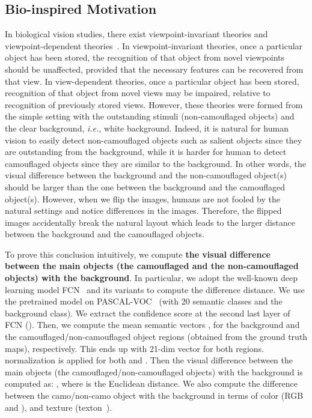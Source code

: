 \documentclass[journal]{IEEEtran}
\begin{document}
\subsection{Bio-inspired Motivation}
\label{sec:motivation}
In biological vision studies, there exist viewpoint-invariant theories and viewpoint-dependent theories~\cite{wilson2003does,burghund2000viewpoint,li2009computational}. In viewpoint-invariant theories, once a particular object has been stored, the recognition of that object from novel viewpoints should be unaffected, provided that the necessary features can be recovered from that view. In view-dependent theories, once a particular object has been stored,
recognition of that object from novel views may be impaired, relative to recognition of previously stored views. However, these theories were formed from the simple setting with the outstanding stimuli (non-camouflaged objects) and the clear background, \textit{i.e.}, white background. Indeed, it is natural for human vision to easily detect non-camouflaged objects such as salient objects since they are outstanding from the background, while it is harder for human to detect camouflaged objects since they are similar to the background. In other words, the visual difference between the background and the non-camouflaged object(s) should be larger than the one between the background and the camouflaged object(s). However, when we flip the images, humans are not fooled by the natural settings and notice differences in the images. Therefore, the flipped images accidentally break the natural layout which leads to the larger distance between the background and the camouflaged objects.



To prove this conclusion intuitively, we compute \textbf{the visual difference between the main objects (the camouflaged and the non-camouflaged objects) with the background}. In particular, we adopt the well-known deep learning model FCN~\cite{Long-ICCV2015} and its variants to compute the difference distance. We use the pretrained model on PASCAL-VOC~\cite{Everingham-ICCV2010} (with 20 semantic classes and the background class). We extract the confidence score at the second last layer of FCN (). Then, we compute the mean semantic vectors ,  for the background and the camouflaged/non-camouflaged object regions (obtained from the ground truth maps), respectively. This ends up with 21-dim vector for both regions.  normalization is applied for both  and . Then the visual difference  between the main objects (the camouflaged/non-camouflaged objects) with the background is computed as: , where  is the Euclidean distance. We also compute the difference between the camo/non-camo object with the background in terms of color (RGB and ), and texture (texton~\cite{texton}).
\end{document}
